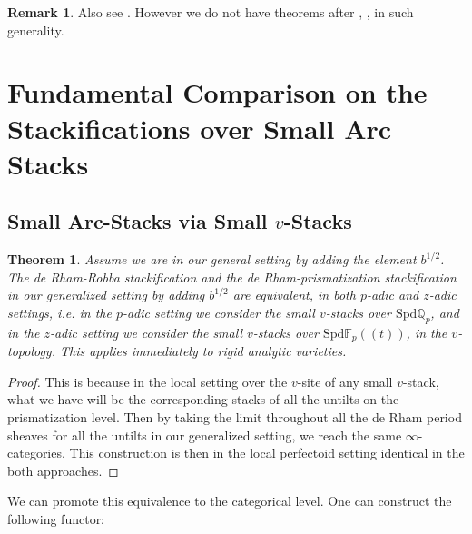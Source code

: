 \documentclass[12pt]{article}
\newtheorem{theorem}{Theorem}
\theoremstyle{definition}
\newtheorem{remark}{Remark}
\begin{document}
\begin{remark}
Also see \cite{1AB}. However we do not have theorems after \cite{1M}, \cite{1K}, \cite{1A} in such generality.
\end{remark}


\newpage
\section{Fundamental Comparison on the Stackifications over Small Arc Stacks}


\subsection{Small Arc-Stacks via Small $v$-Stacks}


\begin{theorem}
Assume we are in our general setting by adding the element $b^{1/2}$. The de Rham-Robba stackification and the de Rham-prismatization stackification in our generalized setting by adding $b^{1/2}$ are equivalent, in both $p$-adic and $z$-adic settings, i.e. in the $p$-adic setting we consider the small $v$-stacks over $\mathrm{Spd}\mathbb{Q}_p$, and in the $z$-adic setting we consider the small $v$-stacks over $\mathrm{Spd}\mathbb{F}_p((t))$, in the $v$-topology. This applies immediately to rigid analytic varieties.
\end{theorem}

\begin{proof}
This is because in the local setting over the $v$-site of any small $v$-stack, what we have will be the corresponding stacks of all the untilts on the prismatization level. Then by taking the limit throughout all the de Rham period sheaves for all the untilts in our generalized setting, we reach the same $\infty$-categories. This construction is then in the local perfectoid setting identical in the both approaches.
\end{proof}


\noindent We can promote this equivalence to the categorical level. One can construct the following functor:
\end{document}
